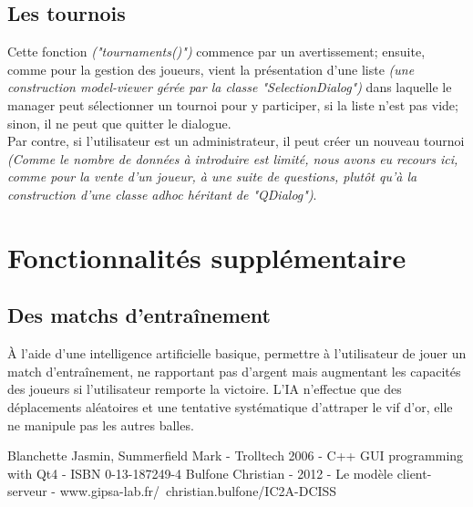 \documentclass[a4paper,titlepage]{scrreprt}
\begin{document}
\subsection{Les tournois}
Cette fonction \emph{("tournaments()")} commence par un avertissement;
ensuite, comme pour la gestion des joueurs, vient la présentation d'une liste 
\emph{(une construction model-viewer gérée par la classe "SelectionDialog")}
dans laquelle le manager peut sélectionner un tournoi pour y participer,
si la liste n'est pas vide; sinon, il ne peut que quitter le dialogue.\\
Par contre, si l'utilisateur est un administrateur, il peut créer un nouveau tournoi
\emph{(Comme le nombre de données à introduire est limité,
nous avons eu recours ici, comme pour la vente d'un joueur, à une suite de questions,
plutôt qu'à la construction d'une classe adhoc héritant de "QDialog")}.

\section{Fonctionnalités supplémentaire}
  \subsection{Des matchs d’entraînement}
    À l'aide d'une intelligence artificielle basique, permettre à l'utilisateur
    de jouer un match d'entraînement, ne rapportant pas d'argent mais
    augmentant les capacités des joueurs si l'utilisateur remporte la victoire.
    L'IA n'effectue que des déplacements aléatoires et une tentative systématique d'attraper le vif d'or,
    elle ne manipule pas les autres balles.
    
  


\begin{thebibliography}{9}
 Blanchette Jasmin, Summerfield Mark - Trolltech 2006 - C++ GUI programming with Qt4 - ISBN 0-13-187249-4
 Bulfone Christian - 2012 - Le modèle client-serveur - www.gipsa-lab.fr/~christian.bulfone/IC2A-DCISS
\end{thebibliography}
\printindex
\end{document}
